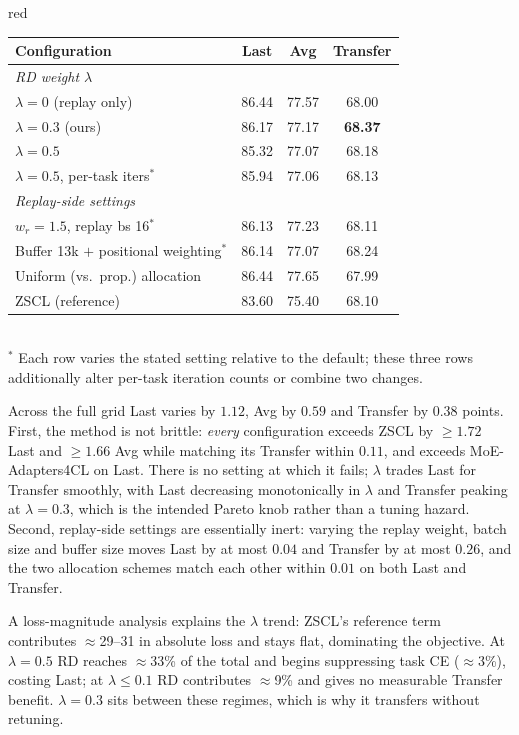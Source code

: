 \documentclass[11pt]{article}
\begin{document}
\begin{color}{red}
\begin{table}[h]\centering\small
\begin{tabular}{lccc}
\hline
\textbf{Configuration} & \textbf{Last} & \textbf{Avg} & \textbf{Transfer} \\
\hline
\multicolumn{4}{l}{\textit{RD weight $\lambda$}} \\
$\lambda{=}0$ (replay only) & 86.44 & 77.57 & 68.00 \\
$\lambda{=}0.3$ (ours) & 86.17 & 77.17 & \textbf{68.37} \\
$\lambda{=}0.5$ & 85.32 & 77.07 & 68.18 \\
$\lambda{=}0.5$, per-task iters$^\ast$ & 85.94 & 77.06 & 68.13 \\
\multicolumn{4}{l}{\textit{Replay-side settings}} \\
$w_r{=}1.5$, replay bs 16$^\ast$ & 86.13 & 77.23 & 68.11 \\
Buffer 13k $+$ positional weighting$^\ast$ & 86.14 & 77.07 & 68.24 \\
Uniform (vs.\ prop.) allocation & 86.44 & 77.65 & 67.99 \\
\hline
ZSCL (reference) & 83.60 & 75.40 & 68.10 \\
\hline
\end{tabular}
\\[2pt]
{\small $^\ast$ Each row varies the stated setting relative to the default; these three
rows additionally alter per-task iteration counts or combine two changes.}
\end{table}

\noindent Across the full grid Last varies by $1.12$, Avg by $0.59$ and Transfer by $0.38$ points. First, the method is not brittle: \emph{every} configuration exceeds ZSCL by $\geq\!1.72$ Last and $\geq\!1.66$ Avg while matching its Transfer within $0.11$, and exceeds MoE-Adapters4CL on Last. There is no setting at which it fails; $\lambda$ trades Last for Transfer smoothly, with Last decreasing monotonically in $\lambda$ and Transfer peaking at $\lambda{=}0.3$, which is the intended Pareto knob rather than a tuning hazard. Second, replay-side settings are essentially inert: varying the replay weight, batch size and buffer size moves Last by at most $0.04$ and Transfer by at most $0.26$, and the two allocation schemes match each other within $0.01$ on both Last and Transfer.

A loss-magnitude analysis explains the $\lambda$ trend: ZSCL's reference term contributes $\approx$29--31 in absolute loss and stays flat, dominating the objective. At $\lambda{=}0.5$ RD reaches $\approx$33\% of the total and begins suppressing task CE ($\approx$3\%), costing Last; at $\lambda\!\leq\!0.1$ RD contributes $\approx$9\% and gives no measurable Transfer benefit. $\lambda{=}0.3$ sits between these regimes, which is why it transfers without retuning.


\end{color}
\end{document}
